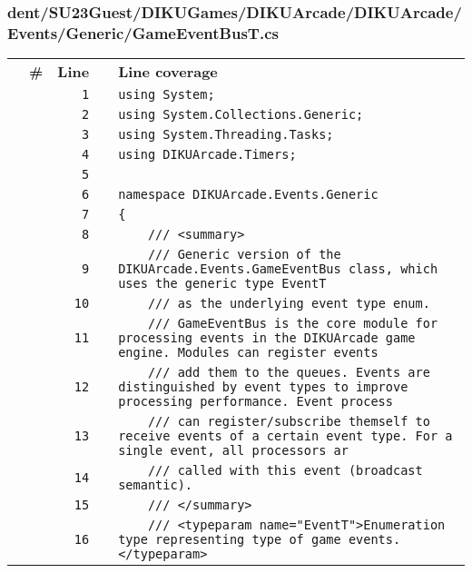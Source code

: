 \documentclass[a4paper,landscape,10pt]{article}
\begin{document}
\subsubsection{dent/SU23Guest/DIKUGames/DIKUArcade/DIKUArcade/Events/Generic/GameEventBusT.cs}
\begin{longtable}[l]{lrrll}
\textbf{} & \textbf{\#} & \textbf{Line} & \textbf{} & \textbf{Line coverage}\\
\cellcolor{gray} &  & \verb~1~ & & \verb~using System;~\\
\cellcolor{gray} &  & \verb~2~ & & \verb~using System.Collections.Generic;~\\
\cellcolor{gray} &  & \verb~3~ & & \verb~using System.Threading.Tasks;~\\
\cellcolor{gray} &  & \verb~4~ & & \verb~using DIKUArcade.Timers;~\\
\cellcolor{gray} &  & \verb~5~ & & \verb~~\\
\cellcolor{gray} &  & \verb~6~ & & \verb~namespace DIKUArcade.Events.Generic~\\
\cellcolor{gray} &  & \verb~7~ & & \verb~{~\\
\cellcolor{gray} &  & \verb~8~ & & \verb~    /// <summary>~\\
\cellcolor{gray} &  & \verb~9~ & & \verb~    /// Generic version of the DIKUArcade.Events.GameEventBus class, which uses the generic type EventT~\\
\cellcolor{gray} &  & \verb~10~ & & \verb~    /// as the underlying event type enum.~\\
\cellcolor{gray} &  & \verb~11~ & & \verb~    /// GameEventBus is the core module for processing events in the DIKUArcade game engine. Modules can register events~\\
\cellcolor{gray} &  & \verb~12~ & & \verb~    /// add them to the queues. Events are distinguished by event types to improve processing performance. Event process~\\
\cellcolor{gray} &  & \verb~13~ & & \verb~    /// can register/subscribe themself to receive events of a certain event type. For a single event, all processors ar~\\
\cellcolor{gray} &  & \verb~14~ & & \verb~    /// called with this event (broadcast semantic).~\\
\cellcolor{gray} &  & \verb~15~ & & \verb~    /// </summary>~\\
\cellcolor{gray} &  & \verb~16~ & & \verb~    /// <typeparam name="EventT">Enumeration type representing type of game events.</typeparam>~\\

\end{longtable}
\end{document}
